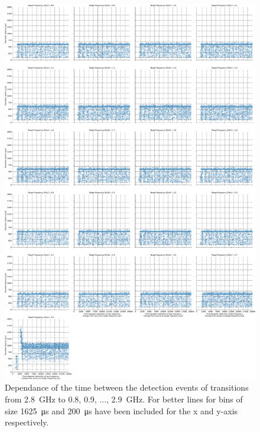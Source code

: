 \begin{figure}[]
    \centering
    \includegraphics[width=\columnwidth]{fig/ftalat_scatter_wait_transition_latency_hati_source_2.8.pdf}
    \caption{Dependance of the time between the detection events of transitions from \SI{2.8}{\GHz} to \SI{0.8}{}, \SI{0.9}{}, ..., \SI{2.9}{\GHz}. For better lines for bins of size \SI{1625}{\us} and \SI{200}{\us} have been included for the x and y-axis respectively.}
\end{figure}
